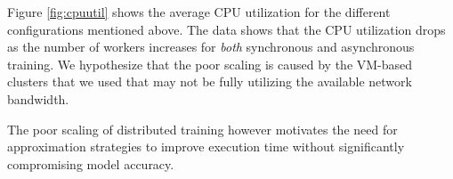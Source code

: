 Figure \ref{fig:cpuutil} shows the average CPU utilization for the 
different configurations mentioned above. The data shows that the 
CPU utilization drops as the number of workers increases for 
{\em both} synchronous and asynchronous training. 
We hypothesize that the poor scaling is caused by the VM-based clusters that we used that may not be fully utilizing the available network bandwidth. 

The poor scaling of distributed training however motivates the need for
approximation strategies to improve execution time without 
significantly compromising model accuracy.





